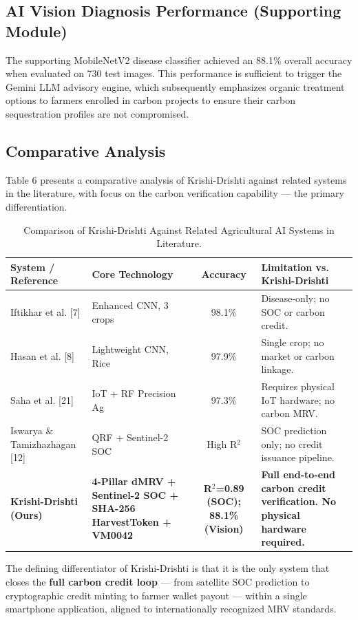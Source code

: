 \documentclass[10pt,a4paper]{article}
\begin{document}
\subsection{AI Vision Diagnosis Performance (Supporting Module)}
The supporting MobileNetV2 disease classifier achieved an 88.1\% overall accuracy when evaluated on 730 test images. This performance is sufficient to trigger the Gemini LLM advisory engine, which subsequently emphasizes organic treatment options to farmers enrolled in carbon projects to ensure their carbon sequestration profiles are not compromised.

\subsection{Comparative Analysis}
Table 6 presents a comparative analysis of Krishi-Drishti against related systems in the literature, with focus on the carbon verification capability — the primary differentiation.

\begin{table}[H]
\centering
\caption{Comparison of Krishi-Drishti Against Related Agricultural AI Systems in Literature.}
\begin{tabularx}{\textwidth}{|p{2.2cm}|X|c|p{3.5cm}|}
\hline
\textbf{System / Reference} & \textbf{Core Technology} & \textbf{Accuracy} & \textbf{Limitation vs. Krishi-Drishti} \\
\hline
Iftikhar et al. [7] & Enhanced CNN, 3 crops & 98.1\% & Disease-only; no SOC or carbon credit. \\
\hline
Hasan et al. [8] & Lightweight CNN, Rice & 97.9\% & Single crop; no market or carbon linkage. \\
\hline
Saha et al. [21] & IoT + RF Precision Ag & 97.3\% & Requires physical IoT hardware; no carbon MRV. \\
\hline
Iswarya \& Tamizhazhagan [12] & QRF + Sentinel-2 SOC & High R$^2$ & SOC prediction only; no credit issuance pipeline. \\
\hline
\textbf{Krishi-Drishti (Ours)} & \textbf{4-Pillar dMRV + Sentinel-2 SOC + SHA-256 HarvestToken + VM0042} & \textbf{R$^2$=0.89 (SOC); 88.1\% (Vision)} & \textbf{Full end-to-end carbon credit verification. No physical hardware required.} \\
\hline
\end{tabularx}
\end{table}

The defining differentiator of Krishi-Drishti is that it is the only system that closes the \textbf{full carbon credit loop} — from satellite SOC prediction to cryptographic credit minting to farmer wallet payout — within a single smartphone application, aligned to internationally recognized MRV standards.
\end{document}
